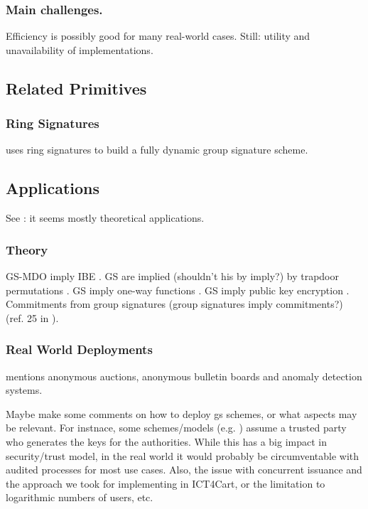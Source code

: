 \subsubsection{Main challenges.}

Efficiency is possibly good for many real-world cases. Still: utility
and unavailability of implementations.


\subsection{Related Primitives}

\subsubsection{Ring Signatures}
\label{sssec:rs}

\cite{rst06}

\cite{bcc+15} uses ring signatures to build a fully dynamic group signature
scheme.

\subsection{Applications}
\label{ssec:gsapplication}

See \cite[Section 1.2.3]{bsi12}: it seems mostly theoretical applications.

\subsubsection{Theory}
\label{sssec:gstheoryapp}

GS-MDO imply IBE \cite{ehk+19}.
GS are implied (shouldn't his by imply?) by trapdoor permutations \cite{bmw03}.
GS imply one-way functions \cite{romp90}.
GS imply public key encryption \cite{aw04}.
Commitments from group signatures (group signatures imply commitments?)
(ref. 25 in \cite{bfg+11}).

\subsubsection{Real World Deployments}
\label{sssec:gsrwdeploy}

\cite{ehk+19} mentions anonymous auctions, anonymous bulletin boards and
anomaly detection systems.

Maybe make some comments on how to deploy gs schemes, or what aspects may be
relevant. For instnace, some schemes/models (e.g. \cite{ly12}) assume a
trusted party who generates the keys for the authorities. While this has
a big impact in security/trust model, in the real world it would probably
be circumventable with audited processes for most use cases. Also, the
issue with concurrent issuance and the approach we took for implementing
\cite{gl19} in ICT4Cart, or the limitation to logarithmic numbers of users, etc.

